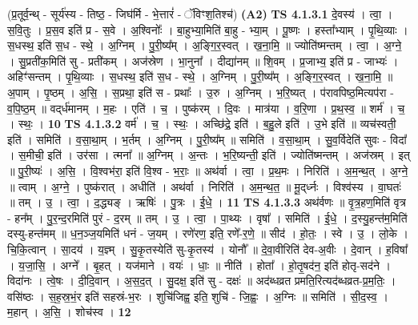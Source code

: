 \documentclass[17pt]{extarticle}
\begin{document}
                  \newline
                      (प्र॒तूर्व॒न्थ् - सूर्य॑स्य - तिष्ठ॒ - जिघ॑र्मि - भे॒त्तारं॑ - ॅविꣳश॒तिश्च॑)  \textbf{(A2)} \newline \newline
                                \textbf{ TS 4.1.3.1} \newline
                  दे॒वस्य॑ । त्वा॒ । स॒वि॒तुः । प्र॒स॒व इति॑ प्र - स॒वे । अ॒श्विनोः᳚ । बा॒हुभ्या॒मिति॑ बा॒हु - भ्या॒म् । पू॒ष्णः । हस्ता᳚भ्याम् । पृ॒थि॒व्याः । स॒धस्थ॒ इति॑ स॒ध - स्थे॒ । अ॒ग्निम् । पु॒री॒ष्य᳚म् । अ॒ङ्गि॒र॒स्वत् । ख॒ना॒मि॒ ॥ ज्योति॑ष्मन्तम् । त्वा॒ । अ॒ग्ने॒ । सु॒प्रती॑क॒मिति॑ सु - प्रती॑कम् । अज॑स्रेण । भा॒नुना᳚ । दीद्या॑नम् ॥ शि॒वम् । प्र॒जाभ्य॒ इति॑ प्र - जाभ्यः॑ । अहिꣳ॑सन्तम् । पृ॒थि॒व्याः । स॒धस्थ॒ इति॑ स॒ध - स्थे॒ । अ॒ग्निम् । पु॒री॒ष्य᳚म् । अ॒ङ्गि॒र॒स्वत् । ख॒ना॒मि॒ ॥ अ॒पाम् । पृ॒ष्ठम् । अ॒सि॒ । स॒प्रथा॒ इति॑ स - प्रथाः᳚ । उ॒रु । अ॒ग्निम् । भ॒रि॒ष्यत् । प॑रावपिष्ठ॒मित्यप॑रा - व॒पि॒ष्ठ॒म् ॥ वद्‌र्ध॑मानम् । म॒हः । एति॑ । च॒ । पुष्क॑रम् । दि॒वः । मात्र॑या । व॒रि॒णा । प्र॒थ॒स्व॒ ॥ शर्म॑ । च॒ । स्थः॒ । \textbf{  10} \newline
                  \newline
                                \textbf{ TS 4.1.3.2} \newline
                  वर्म॑ । च॒ । स्थः॒ । अच्छि॑द्रे॒ इति॑ । ब॒हु॒ले इति॑ । उ॒भे इति॑ ॥ व्यच॑स्वती॒ इति॑ । समिति॑ । व॒सा॒था॒म् । भ॒र्तम् । अ॒ग्निम् । पु॒री॒ष्य᳚म् ॥ समिति॑ । व॒सा॒था॒म् । सु॒व॒र्विदेति॑ सुवः - विदा᳚ । स॒मीची॒ इति॑ । उर॑सा । त्मना᳚ ॥ अ॒ग्निम् । अ॒न्तः । भ॒रि॒ष्यन्ती॒ इति॑ । ज्योति॑ष्मन्तम् । अज॑स्रम् । इत् ॥ पु॒री॒ष्यः॑ । अ॒सि॒ । वि॒श्वभ॑रा॒ इति॑ वि॒श्व - भ॒राः॒ ॥ अथ॑र्वा । त्वा॒ । प्र॒थ॒मः । निरिति॑ । अ॒म॒न्थ॒त् । अ॒ग्ने॒ ॥ त्वाम् । अ॒ग्ने॒ । पुष्क॑रात् । अधीति॑ । अथ॑र्वा । निरिति॑ । अ॒म॒न्थ॒त॒ ॥ मू॒द्‌र्ध्नः । विश्व॑स्य । वा॒घतः॑ ॥ तम् । उ॒ । त्वा॒ । द॒द्ध्यङ् । ऋषिः॑ । पु॒त्रः । ई॒धे॒ । \textbf{  11} \newline
                  \newline
                                \textbf{ TS 4.1.3.3} \newline
                  अथ॑र्वणः ॥ वृ॒त्र॒हण॒मिति॑ वृत्र - हन᳚म् । पु॒र॒न्द॒रमिति॑ पुरं - द॒रम् ॥ तम् । उ॒ । त्वा॒ । पा॒थ्यः । वृषा᳚ । समिति॑ । ई॒धे॒ । द॒स्यु॒हन्त॑म॒मिति॑ दस्यु-हन्त॑मम् ॥ ध॒न॒ञ्ज॒यमिति॑ धनं - ज॒यम् । रणे॑रण॒ इति॒ रणे᳚-र॒णे॒ ॥ सीद॑ । हो॒तः॒ । स्वे । उ॒ । लो॒के । चि॒कि॒त्वान् । सा॒दय॑ । य॒ज्ञ्म् । सु॒कृ॒तस्येति॑ सु-कृ॒तस्य॑ । योनौ᳚ ॥ दे॒वा॒वीरिति॑ देव-अ॒वीः । दे॒वान् । ह॒विषा᳚ । य॒जा॒सि॒ । अग्ने᳚ । बृ॒हत् । यज॑माने । वयः॑ । धाः॒ ॥ नीति॑ । होता᳚ । हो॒तृ॒षद॑न॒ इति॑ होतृ-सद॑ने । विदा॑नः । त्वे॒षः । दी॒दि॒वान् । अ॒स॒द॒त् । सु॒दक्ष॒ इति॑ सु - दक्षः॑ ॥ अद॑ब्धव्रत प्रमति॒रित्यद॑ब्धव्रत-प्र॒म॒तिः॒ । वसि॑ष्ठः । स॒ह॒स्र॒भं॒र इति॑ सहस्रं-भ॒रः । शुचि॑जिह्व॒ इति॒ शुचि॑ - जि॒ह्वः॒ । अ॒ग्निः ॥ समिति॑ । सी॒द॒स्व॒ । म॒हान् । अ॒सि॒ । शोच॑स्व । \textbf{  12} \newline
\end{document}
